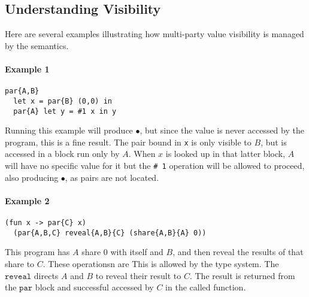 \documentclass[10pt]{article}
\newcommand{\kw}[1]{\ensuremath{\mathtt{#1}}}
\newcommand{\epar}[2]{\ensuremath{\kw{par}~{#1}~{#2}}}
\newcommand{\vcrash}{\ensuremath{\bullet}}
\begin{document}

\subsection{Understanding Visibility}

Here are several examples illustrating how multi-party value
visibility is managed by the semantics.

\paragraph{Example 1}
\begin{verbatim}
par{A,B}
  let x = par{B} (0,0) in
  par{A} let y = #1 x in y
\end{verbatim}
Running this example will produce $\vcrash$, but since the value is never accessed by the program,
this is a fine result. The pair bound in \texttt{x} is only visible to
$B$, but is accessed in a block run only by $A$. When $x$ is looked up
in that latter block, $A$ will have no specific value for it but the
\texttt{\# 1} operation will be allowed to proceed, also producing
$\vcrash$, as pairs are not located.

\paragraph{Example 2}
\begin{verbatim}
(fun x -> par{C} x) 
  (par{A,B,C} reveal{A,B}{C} (share{A,B}{A} 0))
\end{verbatim}
This program has $A$ share $0$ with itself and $B$, and then reveal
the results of that share to $C$. These operationsn are 
This is allowed by the type system. The $\kw{reveal}$ directs $A$ and
$B$ to reveal their result to $C$. The result is returned from the
$\kw{par}$ block and successful accessed by $C$ in the called function.
\end{document}
